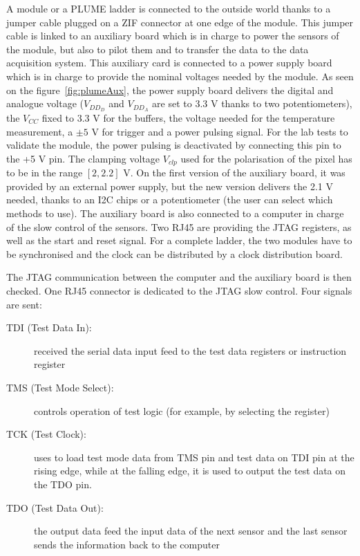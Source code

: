   A module or a PLUME ladder is connected to the outside world thanks to a jumper cable plugged on a ZIF connector at one edge of the module.
  This jumper cable is linked to an auxiliary board which is in charge to power the sensors of the module, but also to pilot them and to transfer the data to the data acquisition system.
  This auxiliary card is connected to a power supply board which is in charge to provide the nominal voltages needed by the module.
  As seen on the figure~\ref{fig:plumeAux}, the power supply board delivers the digital and analogue voltage ($V_{DD_D}$ and $V_{DD_A}$ are set to 3.3 V thanks to two potentiometers), the $V_{CC}$ fixed to 3.3 V for the buffers, the voltage needed for the temperature measurement, a $\pm 5$ V for trigger and a power pulsing signal.
  For the lab tests to validate the module, the power pulsing is deactivated by connecting this pin to the +5 V pin.
  The clamping voltage $V_{clp}$ used for the polarisation of the pixel has to be in the range $\left[2, 2.2\right]$ V.
  On the first version of the auxiliary board, it was provided by an external power supply, but the new version delivers the 2.1 V needed, thanks to an I2C chips or a potentiometer (the user can select which methods to use).
  The auxiliary board is also connected to a computer in charge of the slow control of the sensors.
  Two RJ45 are providing the JTAG registers, as well as the start and reset signal. 
  For a complete ladder, the two modules have to be synchronised and the clock can be distributed by a clock distribution board.

  The JTAG communication between the computer and the auxiliary board is then checked.
  One RJ45 connector is dedicated to the JTAG slow control. 
  Four signals are sent:
  \begin{description}
    \item[TDI (Test Data In):] received the serial data input feed to the test data registers or instruction register
    \item[TMS (Test Mode Select):] controls operation of test logic (for example, by selecting the register)
    \item[TCK (Test Clock):] uses to load test mode data from TMS pin and test data on TDI pin at the rising edge, while at the falling edge, it is used to output the test data on the TDO pin.
    \item[TDO (Test Data Out):] the output data feed the input data of the next sensor and the last sensor sends the information back to the computer 
  \end{description}

